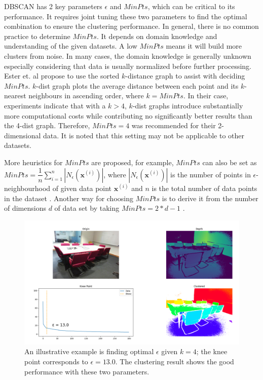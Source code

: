 DBSCAN has 2 key parameters $\epsilon$ and $MinPts$, which can be critical to its performance. It requires joint tuning 
these two parameters to find 
the optimal combination to ensure the clustering performance. In general, 
there is no common practice to determine 
$MinPts$. It depends on domain knowledge and understanding of the given datasets. 
A low $MinPts$ means it will build more clusters from noise. In many cases, the 
domain knowledge is generally unknown especially considering that data is usually normalized 
before further processing. Ester et. al 
\cite{ester1996density} propose to use the sorted $k$-distance graph to assist with 
deciding $MinPts$. $k$-dist graph plots the average distance between each point and its $k$-nearest neighbours in ascending order, where $k=MinPts$. In their case, experiments indicate that with a  $k > 4$,  $k$-dist graphs introduce substantially more computational costs while contributing no significantly better results than the 4-dist graph.
Therefore, $MinPts = 4$ was recommended for their 2-dimensional data. It is noted that this setting may not be applicable to other datasets. 


More heuristics for $MinPts$ are proposed, 
for example, $MinPts$ can also be set as $MinPts = 
\dfrac{1}{n}\sum_{i=1}^{n}|N_{\epsilon}(\mathbf{x}^{(i)})|$, where 
$|N_{\epsilon}(\mathbf{x}^{(i)})|$ is the number of points in 
$\epsilon$-neighbourhood of given data point $\mathbf{x}^{(i)}$ and $n$ is the 
total number of data points in the dataset
\cite{sawant2014adaptive}. Another way for choosing $MinPts$ is to derive it 
from the number of dimensions $d$ of data set by taking $MinPts = 2 * d - 1$ 
\cite{sander1998density}. 

\begin{figure}
	\centering
	\label{fig:para}
	\includegraphics[width=\textwidth]{"Part 3 - Learning Systems/Unsupervised Learning/DBScan/figures/para.png"}
	\caption{An illustrative example is finding optimal $\epsilon$ given $k = 
	4$; the knee point corresponds to $\epsilon = 13.0$. The clustering result 
	shows the good performance with these two parameters.}
\end{figure}


